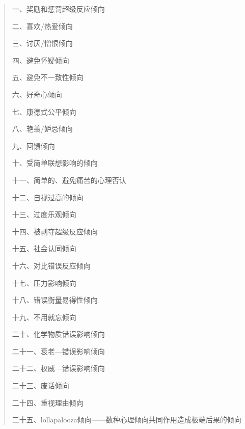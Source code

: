 \begin{quotation}
一、奖励和惩罚超级反应倾向
\par

二、喜欢/热爱倾向
\par

三、讨厌/憎恨倾向
\par

四、避免怀疑倾向
\par

五、避免不一致性倾向
\par

六、好奇心倾向
\par

七、康德式公平倾向
\par

八、艳羡/妒忌倾向
\par

九、回馈倾向
\par

十、受简单联想影响的倾向
\par

十一、简单的、避免痛苦的心理否认
\par

十二、自视过高的倾向
\par

十三、过度乐观倾向
\par

十四、被剥夺超级反应倾向
\par

十五、社会认同倾向
\par

十六、对比错误反应倾向
\par

十七、压力影响倾向
\par

十八、错误衡量易得性倾向
\par

十九、不用就忘倾向
\par

二十、化学物质错误影响倾向
\par

二十一、衰老—错误影响倾向
\par

二十二、权威—错误影响倾向
\par

二十三、废话倾向
\par

二十四、重视理由倾向
\par

二十五、lollapalooza倾向——数种心理倾向共同作用造成极端后果的倾向
\par
\end{quotation}

